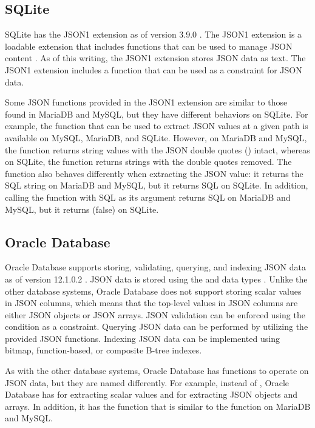 \subsection{SQLite}

SQLite has the JSON1 extension as of version 3.9.0 \cite{sqlite:3.9.0}. The
JSON1 extension is a loadable extension that includes functions that can be
used to manage JSON content \cite{sqlite:json1}. As of this writing, the JSON1
extension stores JSON data as text. The JSON1 extension includes a
 function that can be used as a  constraint for
JSON data.

Some JSON functions provided in the JSON1 extension are similar to those found
in MariaDB and MySQL, but they have different behaviors on SQLite. For example,
the  function that can be used to extract JSON values at a
given path is available on MySQL, MariaDB, and SQLite. However, on MariaDB and
MySQL, the function returns string values with the JSON double quotes
() intact, whereas on SQLite, the function returns strings with the
double quotes removed. The function also behaves differently when extracting
the JSON  value: it returns the SQL string  on
\mbox{MariaDB} and MySQL, but it returns SQL  on SQLite. In
addition, calling the  function with SQL  as its
argument returns SQL  on MariaDB and MySQL, but it returns 
(false) on SQLite.

\subsection{Oracle Database}

Oracle Database supports storing, validating, querying, and indexing JSON data
as of version 12.1.0.2 \cite{oracle:12.1.0.2}. JSON data is stored using the
 and  data types \cite{oracle:json}. Unlike the other
database systems, Oracle Database does not support storing scalar values in
JSON columns, which means that the top-level values in JSON columns are either
JSON objects or JSON arrays. JSON validation can be enforced using the  condition as a  constraint. Querying JSON data can be
performed by utilizing the provided JSON functions. Indexing JSON data can be
implemented using bitmap, function-based, or composite B-tree indexes.

As with the other database systems, Oracle Database has functions to operate on
JSON data, but they are named differently. For example, instead of
, Oracle Database has  for extracting
scalar values and  for extracting JSON objects and arrays. In
addition, it has the  function that is similar to the
 function on MariaDB and MySQL.

